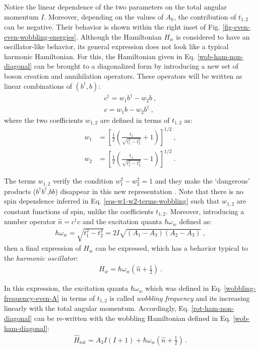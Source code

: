 Notice the linear dependence of the two parameters on the total angular momentum $I$. Moreover, depending on the values of $A_k$, the contribution of $t_{1,2}$ can be negative. Their behavior is shown within the right inset of Fig. \ref{fig-even-even-wobbling-energies}. Although the Hamiltonian $H_w$ is considered to have an oscillator-like behavior, its general expression does not look like a typical harmonic Hamiltonian. For this, the Hamiltonian given in Eq. \ref{wob-ham-non-diagonal} can be brought to a diagonalized form by introducing a new set of boson creation and annihilation operators. These operators will be written as linear combinations of $(b^\dagger,b)$:
\begin{align}
    c^\dagger=w_1b^\dagger-w_2b\ ,\\
    c=w_1b-w_2b^\dagger\ ,
\end{align}
where the two coefficients $w_{1,2}$ are defined in terms of $t_{1,2}$ as:
\begin{align}
    w_1&=\left[\frac{1}{2}\left(\frac{t_1}{\sqrt{t_1^2-t_2^2}}+1\right)\right]^{1/2}\ ,\nonumber\\
    w_2&=\left[\frac{1}{2}\left(\frac{t_1}{\sqrt{t_1^2-t_2^2}}-1\right)\right]^{1/2}\ .
    \label{eqs-w1-w2-terms-wobbling}
\end{align}

The terms $w_{1,2}$ verify the condition $w_1^2-w_2^2=1$ and they make the `dangerous' products ($b^\dagger b^\dagger$,$bb$) disappear in this new representation \cite{oi2006semi}. Note that there is no spin dependence inferred in Eq. \ref{eqs-w1-w2-terms-wobbling} such that $w_{1,2}$ are constant functions of spin, unlike the coefficients $t_{1,2}$. Moreover, introducing a number operator $\hat{n}=c^\dagger c$ and the excitation quanta $\hbar\omega_w$ defined as:
\begin{align}
    \hbar\omega_w=\sqrt{t_1^2-t_2^2}=2I\sqrt{(A_1-A_3)(A_2-A_3)}\ ,
    \label{wobbling-frequency-even-A}
\end{align}
then a final expression of $H_w$ can be expressed, which has a behavior typical to the \emph{harmonic oscillator}:
\begin{align}
    H_w=\hbar\omega_w\left(\hat{n}+\frac{1}{2}\right)\ .
    \label{wob-ham-diagonal}
\end{align}

In this expression, the excitation quanta $\hbar\omega_w$ which was defined in Eq. \ref{wobbling-frequency-even-A} in terms of $t_{1,2}$ is called \emph{wobbling frequency} and its increasing linearly with the total angular momentum. Accordingly, Eq. \ref{rot-ham-non-diagonal} can be re-written with the wobbling Hamiltonian defined in Eq. \ref{wob-ham-diagonal}:
\begin{align}
    \hat{H}_\text{rot}=A_3I(I+1)+\hbar\omega_w\left(\hat{n}+\frac{1}{2}\right)\ .
    \label{rot-wob-ham-diagonal}
\end{align}

